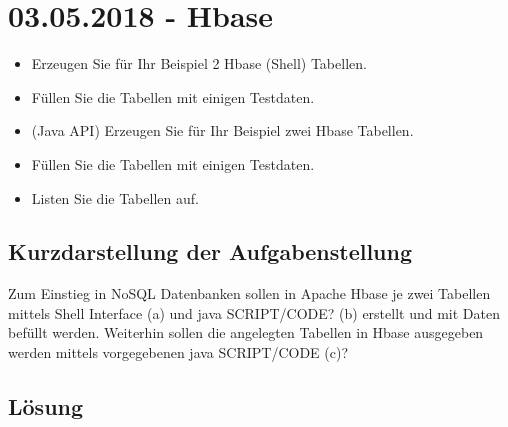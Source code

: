 \section{03.05.2018 - Hbase}
\begin{itemize}
\item Erzeugen Sie für Ihr Beispiel 2 Hbase (Shell) Tabellen.
\item Füllen Sie die Tabellen mit einigen Testdaten.
\item (Java API) Erzeugen Sie für Ihr Beispiel zwei Hbase Tabellen.
\item Füllen Sie die Tabellen mit einigen Testdaten.
\item Listen Sie die Tabellen auf.
\end{itemize}
\subsection{Kurzdarstellung der Aufgabenstellung}
Zum Einstieg in NoSQL Datenbanken sollen in Apache Hbase je zwei Tabellen mittels Shell Interface (a) und java SCRIPT/CODE? (b) erstellt und mit Daten befüllt werden. Weiterhin sollen die angelegten Tabellen in Hbase ausgegeben werden mittels vorgegebenen java SCRIPT/CODE (c)?
\subsection{Lösung}

